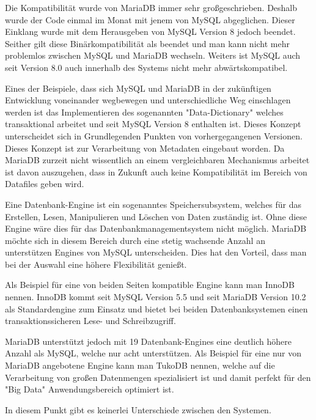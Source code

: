 Die Kompatibilität wurde von MariaDB immer sehr großgeschrieben. Deshalb wurde der Code einmal im Monat mit jenem von MySQL abgeglichen. Dieser Einklang wurde mit dem Herausgeben von MySQL Version 8 jedoch beendet. Seither gilt diese Binärkompatibilität als beendet und man kann nicht mehr problemlos zwischen MySQL und MariaDB wechseln. Weiters ist MySQL auch seit Version 8.0 auch innerhalb des Systems nicht mehr abwärtskompatibel. \cite{MariaVsMy}

Eines der Beispiele, dass sich MySQL und MariaDB in der zukünftigen Entwicklung voneinander wegbewegen und unterschiedliche Weg einschlagen werden ist das Implementieren des sogenannten "Data-Dictionary" welches transaktional arbeitet und seit MySQL Version 8 enthalten ist. Dieses Konzept unterscheidet sich in Grundlegenden Punkten von vorhergegangenen Versionen. Dieses Konzept ist zur  Verarbeitung von Metadaten eingebaut worden. Da MariaDB zurzeit nicht wissentlich an einem vergleichbaren Mechanismus arbeitet ist davon auszugehen, dass in Zukunft auch keine Kompatibilität im Bereich von Datafiles geben wird. \cite{MariaVsMy}


Eine Datenbank-Engine ist ein sogenanntes Speichersubsystem, welches für das Erstellen, Lesen, Manipulieren und Löschen von Daten zuständig ist. Ohne diese Engine wäre dies für das Datenbankmanagementsystem nicht möglich.
MariaDB möchte sich in diesem Bereich durch eine stetig wachsende Anzahl an unterstützen Engines von MySQL unterscheiden. Dies hat den Vorteil, dass man bei der Auswahl eine höhere Flexibilität genießt. \cite{MariaVsMy}

Als Beispiel für eine von beiden Seiten kompatible Engine kann man InnoDB nennen. InnoDB kommt seit MySQL Version 5.5 und seit MariaDB Version 10.2 als Standardengine zum Einsatz und bietet bei beiden Datenbanksystemen einen transaktionssicheren Lese- und Schreibzugriff. \cite{MariaVsMy}

MariaDB unterstützt jedoch mit 19 Datenbank-Engines eine deutlich höhere Anzahl als MySQL, welche nur acht unterstützen. Als Beispiel für eine nur von MariaDB angebotene Engine kann man TukoDB nennen, welche auf die Verarbeitung von großen Datenmengen spezialisiert ist und damit perfekt für den "Big Data" Anwendungsbereich optimiert ist. \cite{MariaVsMy}


In diesem Punkt gibt es keinerlei Unterschiede zwischen den Systemen. \cite{MariaVsMy}

